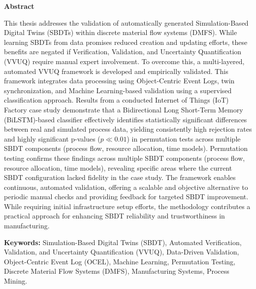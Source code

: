 \thispagestyle{plain} %

\vspace*{1.5in} %

\begin{center}
  {\Large \textbf{Abstract}}
\end{center}

This thesis addresses the validation of automatically generated Simulation-Based Digital Twins (SBDTs) within discrete material flow systems (DMFS). While learning SBDTs from data promises reduced creation and updating efforts, these benefits are negated if Verification, Validation, and Uncertainty Quantification (VVUQ) require manual expert involvement. To overcome this, a multi-layered, automated VVUQ framework is developed and empirically validated. This framework integrates data processing using Object-Centric Event Logs, twin synchronization, and Machine Learning-based validation using a supervised classification approach. Results from a conducted Internet of Things (IoT) Factory case study demonstrate that a Bidirectional Long Short-Term Memory (BiLSTM)-based classifier effectively identifies statistically significant differences between real and simulated process data, yielding consistently high rejection rates and highly significant p-values ($p \ll 0.01$) in permutation tests across multiple SBDT components (process flow, resource allocation, time models). Permutation testing confirms these findings across multiple SBDT components (process flow, resource allocation, time models), revealing specific areas where the current SBDT configuration lacked fidelity in the case study. The framework enables continuous, automated validation, offering a scalable and objective alternative to periodic manual checks and providing feedback for targeted SBDT improvement. While requiring initial infrastructure setup efforts, the methodology contributes a practical approach for enhancing SBDT reliability and trustworthiness in manufacturing.

\vspace{0.3in}

\textbf{Keywords:} Simulation-Based Digital Twins (SBDT), Automated Verification, Validation, and Uncertainty Quantification (VVUQ), Data-Driven Validation, Object-Centric Event Log (OCEL), Machine Learning, Permutation Testing, Discrete Material Flow Systems (DMFS), Manufacturing Systems, Process Mining.

\clearpage